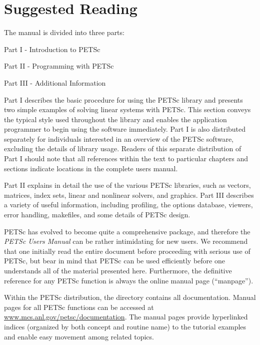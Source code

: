 \section{Suggested Reading}

The manual is
divided into three parts:
\begin{tightitemize}
\item Part I - Introduction to PETSc
\item Part II - Programming with PETSc
\item Part III - Additional Information
\end{tightitemize}

Part I describes
the basic procedure for using the PETSc library and presents two
simple examples of solving linear systems with PETSc.  This section
conveys the typical style used throughout the library and enables the
application programmer to begin using the software immediately.
Part I is also distributed separately for individuals interested in an
overview of the PETSc software, excluding the details of library usage.
Readers of this separate distribution of Part I should note that all
references within the text to particular chapters and sections
indicate locations in the complete users manual.

Part II explains in detail the use of the various PETSc libraries,
such as vectors, matrices, index sets, linear and nonlinear
solvers, and graphics.  Part III describes a variety of useful
information, including profiling, the options database, viewers, error
handling, makefiles, and some details of
PETSc design.

\nocite{efficient}

PETSc has evolved to become quite a comprehensive package, and therefore the
{\em PETSc Users Manual} can be rather intimidating for new users. We
recommend that one initially read the entire document before proceeding with
serious use of PETSc, but bear in mind that PETSc can be used efficiently
before one understands all of the material presented here. Furthermore, the
definitive reference for any PETSc function is always the online manual page (``manpage'').

\medskip \medskip

Within the PETSc distribution, the directory 
contains all documentation.
Manual pages for all PETSc functions can be
accessed at \href{https://www.mcs.anl.gov/petsc/documentation}{www.mcs.anl.gov/petsc/documentation}.
The manual pages
provide hyperlinked indices (organized by
both concept and routine name) to the tutorial examples and enable
easy movement among related topics.

